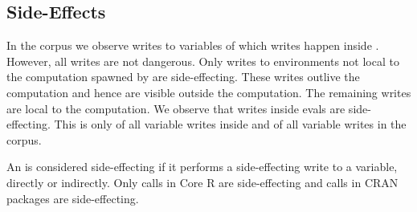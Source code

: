 \documentclass[conference]{IEEEtran}
\begin{document}

\subsection{Side-Effects}

In the corpus we observe \AllWritesRnd writes to variables of which
\EvalWritesRnd writes happen inside \eval. However, all writes are not
dangerous. Only writes to environments not local to the computation spawned
by \eval are side-effecting. These writes outlive the computation and hence are
visible outside the computation. The remaining writes are local to the
computation. We observe that \EvalSideEffectingWritesRnd writes inside evals are
side-effecting. This is only \EvalSideEffectingWritesEvalPerc of all variable
writes inside \eval and \EvalSideEffectingWritesAllPerc of all variable writes
in the corpus.

An \eval is considered side-effecting if it performs a side-effecting write to a
variable, directly or indirectly. Only \SideEffectingCoreCallPerc \eval calls in
Core R are side-effecting and \SideEffectingPackageCallPerc \eval calls in CRAN
packages are side-effecting.
\end{document}
